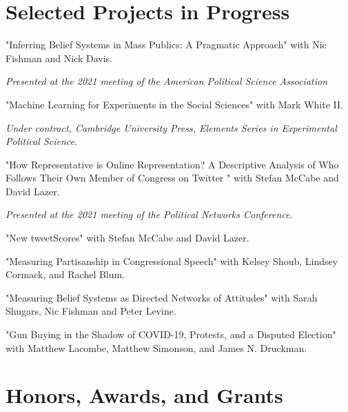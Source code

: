 \documentclass[letterpaper]{article}
\renewenvironment{itemize}{
  \begin{list}{}{
    \setlength{\leftmargin}{1.5em}
  }
}{
  \end{list}
}
\begin{document}
\section*{Selected Projects in Progress}

\begin{itemize}

\item "Inferring Belief Systems in Mass Publics: A Pragmatic Approach" with Nic Fishman and Nick Davis.
\begin{itemize}
\item \textit{Presented at the 2021 meeting of the American Political Science Association}
\end{itemize} 

\item "Machine Learning for Experiments in the Social Sciences" with Mark White II.
\begin{itemize}
\item  \textit{Under contract, Cambridge University Press, Elements Series in Experimental Political Science}.
\end{itemize}

\item "How Representative is Online Representation? A Descriptive Analysis of Who Follows Their Own Member of Congress on Twitter " with Stefan McCabe and David Lazer.
\begin{itemize}
\item \textit{Presented at the 2021 meeting of the Political Networks Conference}.
\end{itemize} 

\item "New tweetScores" with Stefan McCabe and David Lazer.

\item "Measuring Partisanship in Congressional Speech" with Kelsey Shoub, Lindsey Cormack, and Rachel Blum.

\item "Measuring Belief Systems as Directed Networks of Attitudes" with Sarah Shugars, Nic Fishman and Peter Levine.

\item "Gun Buying in the Shadow of COVID-19, Protests, and a Disputed Election" with Matthew Lacombe, Matthew Simonson, and James N. Druckman.

\end{itemize}

\section*{Honors, Awards, and Grants}
\end{document}

